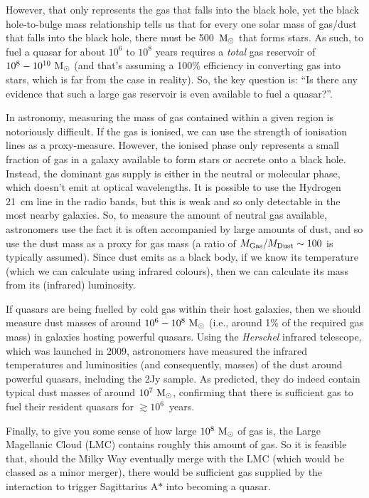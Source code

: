 \documentclass[11pt]{article}
\begin{document}
However, that only represents the gas that falls into the black hole,
yet the black hole-to-bulge mass relationship tells us that for every
one solar mass of gas/dust that falls into the black hole, there must
be 500~${\rm M_\odot}$ that forms stars. As such, to fuel a
quasar for about $10^6$ to $10^8$ years requires a {\it total} gas
reservoir of $10^8 - 10^{10}~{\rm M_\odot}$ (and that's assuming a
100\% efficiency in converting gas into stars, which is far from the
case in reality). So, the key question is: ``Is there any evidence
that such a large gas reservoir is even available to fuel a quasar?''.

In astronomy, measuring the mass of gas contained within a given
region is notoriously difficult. If the gas is ionised, we can use the
strength of ionisation lines as a proxy-measure. However, the ionised
phase only represents a small fraction of gas in a galaxy available to
form stars or accrete onto a black hole. Instead, the dominant gas
supply is either in the neutral or molecular phase, which doesn't emit
at optical wavelengths. It is possible to use the Hydrogen 21~cm line
in the radio bands, but this is weak and so only detectable in the
most nearby galaxies. So, to measure the amount of neutral gas available,
astronomers use the fact it is often accompanied by large amounts of
dust, and so use the dust mass as a proxy for gas mass (a ratio of
$M_{\rm Gas}/M_{\rm Dust}\sim100$ is typically assumed). Since dust
emits as a black body, if we know its temperature (which we can
calculate using infrared colours), then we can calculate its mass from
its (infrared) luminosity. 

If quasars are being fuelled by cold gas within their host galaxies,
then we should measure dust masses of around $10^6-10^8~{\rm M_\odot}$
(i.e., around 1\% of the required gas mass) in galaxies hosting
powerful quasars. Using the {\it Herschel} infrared telescope, which
was launched in 2009, astronomers have measured the infrared
temperatures and luminosities (and consequently, masses) of the dust
around powerful quasars, including the 2Jy sample. As predicted, they
do indeed contain typical dust masses of around $10^7~{\rm M_\odot}$,
confirming that there is sufficient gas to fuel their resident quasars
for $\gtrsim10^6$~years.

Finally, to give you some sense of how large $10^8~{\rm M_\odot}$ of
gas is, the Large Magellanic Cloud (LMC) contains roughly this amount
of gas. So it is feasible that, should the Milky Way eventually merge
with the LMC (which would be classed as a minor merger), there would
be sufficient gas supplied by the interaction to trigger Sagittarius
A$\ast$ into becoming a quasar.
\end{document}
